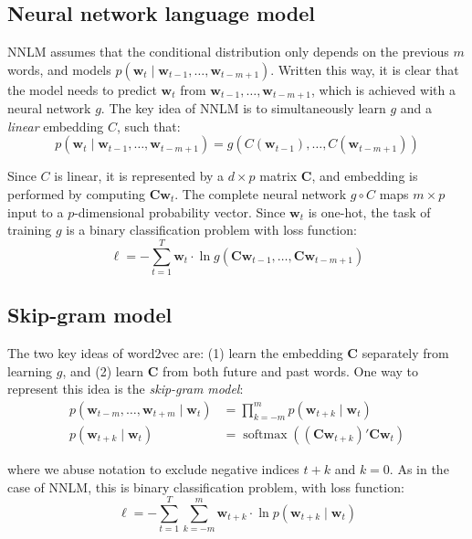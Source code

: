 \documentclass{amsart}
\newcommand\vw{\symbf{w}}
\newcommand\mc{\symbf{C}}
\begin{document}
\subsection{Neural network language model}

NNLM \cite{Bengio2003} assumes that the conditional distribution only depends
on the previous \(m\) words, and models \(p(\vw_t \mid \vw_{t-1}, \ldots,
\vw_{t - m + 1})\). Written this way, it is clear that the model needs to
predict \(\vw_t\) from \(\vw_{t-1}, \ldots, \vw_{t - m + 1}\), which is
achieved with a neural network \(g\). The key idea of NNLM is to simultaneously
learn \(g\) and a \emph{linear} embedding \(C\), such that:
%
\begin{equation}
  p(\vw_t \mid \vw_{t-1}, \ldots, \vw_{t - m + 1}) = g(C(\vw_{t-1}), \ldots, C(\vw_{t - m + 1}))
\end{equation}

Since \(C\) is linear, it is represented by a \(d \times p\) matrix \(\mc\),
and embedding is performed by computing \(\mc \vw_t\). The complete neural
network \(g \circ C\) maps \(m \times p\) input to a \(p\)-dimensional
probability vector. Since \(\vw_t\) is one-hot, the task of training \(g\) is a
binary classification problem with loss function:
%
\begin{equation}
  \ell = -\sum_{t=1}^T \vw_t \cdot \ln g(\mc\vw_{t-1}, \ldots, \mc\vw_{t - m + 1})
\end{equation}

\subsection{Skip-gram model}

The two key ideas of word2vec \cite{Mikolov2013a,Mikolov2013b} are: (1) learn
the embedding \(\mc\) separately from learning \(g\), and (2) learn \(\mc\)
from both future and past words. One way to represent this idea is the
\emph{skip-gram model}:
%
\begin{align}
  p(\vw_{t-m}, \ldots, \vw_{t+m} \mid \vw_t) &= \prod_{k=-m}^{m} p(\vw_{t+k} \mid \vw_t)\\
  p(\vw_{t+k} \mid \vw_t) &= \operatorname{softmax}((\mc\vw_{t+k})' \mc\vw_t)
\end{align}

where we abuse notation to exclude negative indices \(t + k\) and \(k = 0\). As
in the case of NNLM, this is binary classification problem, with loss function:
%
\begin{equation}
  \ell = -\sum_{t=1}^T \sum_{k=-m}^m \vw_{t + k} \cdot \ln p(\vw_{t+k} \mid \vw_t)
  \label{eq:skipgram}
\end{equation}
\end{document}
